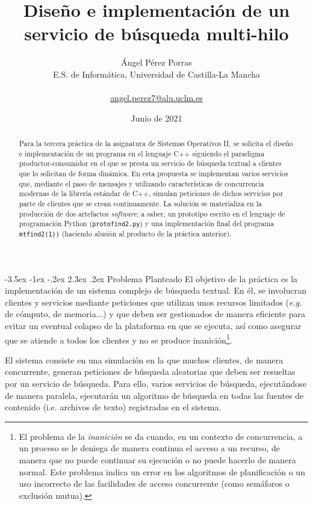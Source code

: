 \documentclass[a4paper]{article}
\title{
	\fontfamily{phv}\selectfont
	\textbf{Diseño e implementación de un servicio de búsqueda multi-hilo}
}
\author{
	\fontfamily{phv}\selectfont
	Ángel Pérez Porras \\
	\fontfamily{phv}\selectfont
	E.S. de Informática, Universidad de Castilla-La Mancha \\ \\
	\fontfamily{phv}\selectfont
	\hyperref{mailto:angel.perez7@alu.uclm.es}{}{}{angel.perez7@alu.uclm.es}
}
\date{\fontfamily{phv}\selectfont Junio de 2021}
\makeatletter
\renewcommand\section{\@startsection {section}{1}{\z@}%
	{-3.5ex \@plus -1ex \@minus -.2ex}%
	{2.3ex \@plus.2ex}%
	{\normalfont\large\scshape}}
\makeatother
\begin{document}
	\maketitle
	
	\begin{abstract}
		Para la tercera práctica de la asignatura de Sistemas Operativos II, se solicita el diseño e implementación de un programa en el lenguaje C++ siguiendo el paradigma productor-consumidor en el que se presta un servicio de búsqueda textual a clientes que lo solicitan de forma dinámica. En esta propuesta se implementan varios servicios que, mediante el paso de mensajes y utilizando características de concurrencia modernas de la librería estándar de C++, simulan peticiones de dichos servicios por parte de clientes que se crean continuamente. La solución se materializa en la producción de dos artefactos \textit{software}; a saber, un prototipo escrito en el lenguaje de programación Python (\texttt{protofind2.py}) y una implementación final del programa \texttt{mtfind2(1))} (haciendo alusión al producto de la práctica anterior).
	\end{abstract}

	\tableofcontents
	
	
	\section{Problema Planteado}
	El objetivo de la práctica es la implementación de un sistema complejo de búsqueda textual. En él, se involucran clientes y servicios mediante peticiones que utilizan unos recursos limitados (\textit{e.g.} de cómputo, de memoria...) y que deben ser gestionados de manera eficiente para evitar un eventual colapso de la plataforma en que se ejecuta, así como asegurar que se atiende a todos los clientes y no se produce inanición\footnote{El problema de la \textit{inanición} se da cuando, en un contexto de concurrencia, a un proceso se le deniega de manera continua el acceso a un recurso, de manera que no puede continuar su ejecución o no puede hacerlo de manera normal. Este problema indica un error en los algoritmos de planificación o un uso incorrecto de las facilidades de acceso concurrente (como semáforos o exclusión mutua).}.
	
	El sistema consiste en una simulación en la que muchos clientes, de manera concurrente, generan peticiones de búsqueda aleatorias que deben ser resueltas por un servicio de búsqueda. Para ello, varios servicios de búsqueda, ejecutándose de manera paralela, ejecutarán un algoritmo de búsqueda en todas las fuentes de contenido (i.e. archivos de texto) registradas en el sistema.
	
\end{document}
